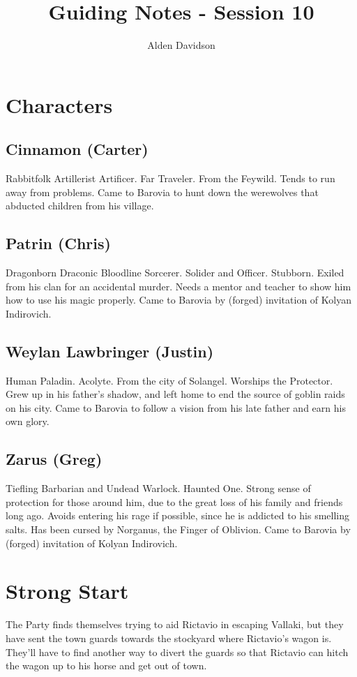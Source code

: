 \documentclass[a4paper,11pt]{article}
\title{Guiding Notes - Session 10}
\author{Alden Davidson}
\begin{document}
\maketitle
\tableofcontents

\pagebreak
\section{Characters}
\label{sec:Characters}
\subsection{Cinnamon (Carter)}
  Rabbitfolk Artillerist Artificer. Far Traveler. From the Feywild. Tends to run away from problems. Came to
  Barovia to hunt down the werewolves that abducted children from his village.
\subsection{Patrin (Chris)}
  Dragonborn Draconic Bloodline Sorcerer. Solider and Officer. Stubborn. Exiled from his clan for an accidental 
  murder. Needs a mentor and teacher to show him how to use his magic properly. Came to Barovia by (forged)
  invitation of Kolyan Indirovich.
\subsection{Weylan Lawbringer (Justin)}
  Human Paladin. Acolyte. From the city of Solangel. Worships the Protector. Grew up in his father's shadow, and 
  left home to end the source of goblin raids on his city. Came to Barovia to follow a vision from his late 
  father and earn his own glory.
\subsection{Zarus (Greg)}
  Tiefling Barbarian and Undead Warlock. Haunted One. Strong sense of protection for those around him, due to the
  great loss of his family and friends long ago. Avoids entering his rage if possible, since he is addicted to 
  his smelling salts. Has been cursed by Norganus, the Finger of Oblivion. Came to Barovia by (forged) 
  invitation of Kolyan Indirovich.


\pagebreak
\section{Strong Start}
\label{sec:StrongStart}
The Party finds themselves trying to aid Rictavio in escaping Vallaki, but they have sent the town guards towards 
the stockyard where Rictavio's wagon is. They'll have to find another way to divert the guards so that Rictavio can 
hitch the wagon up to his horse and get out of town.
\end{document}
